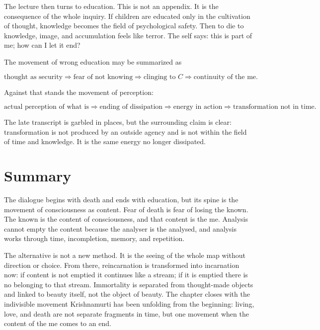 The lecture then turns to education. This is not an appendix. It is the consequence of the whole inquiry. If children are educated only in the cultivation of thought, knowledge becomes the field of psychological safety. Then to die to knowledge, image, and accumulation feels like terror. The self says: this is part of me; how can I let it end?

The movement of wrong education may be summarized as

\begin{equation}
\text{thought as security}
\Rightarrow
\text{fear of not knowing}
\Rightarrow
\text{clinging to } C
\Rightarrow
\text{continuity of the me}.
\end{equation}

Against that stands the movement of perception:

\begin{equation}
\text{actual perception of what is}
\Rightarrow
\text{ending of dissipation}
\Rightarrow
\text{energy in action}
\Rightarrow
\text{transformation not in time}.
\end{equation}

The late transcript is garbled in places, but the surrounding claim is clear: transformation is not produced by an outside agency and is not within the field of time and knowledge. It is the same energy no longer dissipated.

\section{Summary}

The dialogue begins with death and ends with education, but its spine is the movement of consciousness as content. Fear of death is fear of losing the known. The known is the content of consciousness, and that content is the me. Analysis cannot empty the content because the analyser is the analysed, and analysis works through time, incompletion, memory, and repetition.

The alternative is not a new method. It is the seeing of the whole map without direction or choice. From there, reincarnation is transformed into incarnation now: if content is not emptied it continues like a stream; if it is emptied there is no belonging to that stream. Immortality is separated from thought-made objects and linked to beauty itself, not the object of beauty. The chapter closes with the indivisible movement Krishnamurti has been unfolding from the beginning: living, love, and death are not separate fragments in time, but one movement when the content of the me comes to an end.